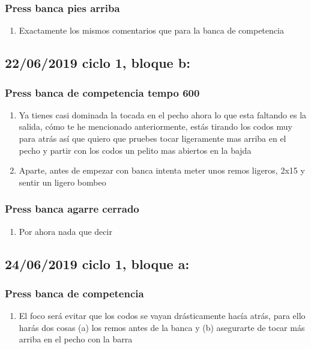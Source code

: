 \documentclass[11pt]{article}
\begin{document}
\subsubsection{Press banca pies arriba}
\label{sec:org5648382}
\begin{enumerate}
\item Exactamente los mismos comentarios que para la banca de competencia
\end{enumerate}
\subsection{22/06/2019 ciclo 1, bloque b:}
\label{sec:org540eded}
\subsubsection{Press banca de competencia tempo 600}
\label{sec:org9c6ee06}
\begin{enumerate}
\item Ya tienes casi dominada la tocada en el pecho ahora lo que esta
faltando es la salida, cómo te he mencionado anteriormente, estás
tirando los codos muy para atrás así que quiero que pruebes tocar
ligeramente mas arriba en el pecho y partir con los codos un pelito
mas abiertos en la bajda
\item Aparte, antes de empezar con banca intenta meter unos remos
ligeros, 2x15 y sentir un ligero bombeo
\end{enumerate}
\subsubsection{Press banca agarre cerrado}
\label{sec:orgbcf7cdd}
\begin{enumerate}
\item Por ahora nada que decir
\end{enumerate}
\subsection{24/06/2019 ciclo 1, bloque a:}
\label{sec:orgc1f34d6}
\subsubsection{Press banca de competencia}
\label{sec:org7693a33}
\begin{enumerate}
\item El foco será evitar que los codos se vayan drásticamente hacía
atrás, para ello harás dos cosas (a) los remos antes de la banca y
(b) asegurarte de tocar más arriba en el pecho con la barra
\end{enumerate}
\end{document}
